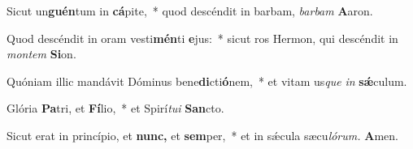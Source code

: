 \item Sicut un\textbf{guén}tum in \textbf{cá}pite,~* quod descéndit in barbam, \textit{barbam} \textbf{A}aron.
\item Quod descéndit in oram vesti\textbf{mén}ti \textbf{e}jus:~* sicut ros Hermon, qui descéndit in \textit{montem} \textbf{Si}on.
\item Quóniam illic mandávit Dóminus bene\textbf{di}cti\textbf{ó}nem,~* et vitam us\hspace{0.02em}\textit{que} \textit{in} \textbf{sǽ}culum.
\item Glória \textbf{Pa}tri, et \textbf{Fí}lio,~* et Spirí\tinyhspace\textit{tui} \textbf{San}cto.
\item Sicut erat in princípio, et \textbf{nunc,} et \textbf{sem}per,~* et in sǽcula sæcu\tinyhspace\textit{lórum.} \textbf{A}men.